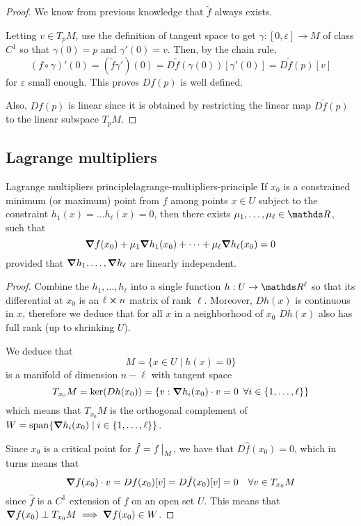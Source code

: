 \documentclass[12pt]{extarticle}
\numberwithin{equation}{subsection}
\begin{document}
\begin{proof}
	We know from previous knowledge that $\tilde f$ always exists.

	Letting $v \in T_pM$, use the definition of tangent space to get $\gamma: [0, \varepsilon] \to M$
	of class $C^1$ so that $\gamma(0) = p$ and $\gamma'(0) = v$.
	Then, by the chain rule,
	\begin{equation}
		(f\circ \gamma)'(0) = (\tilde f \gamma')(0) = D \tilde f(\gamma(0))[\gamma'(0)] = D \tilde
		f(p)[v]
	\end{equation}
	for $\varepsilon$ small enough.
	This proves $Df(p)$ is well defined.

	Also, $Df(p)$ is linear since it is obtained by restricting the linear map $D \tilde f(p)$ to the
	linear subspace $T_pM$.
\end{proof}

\subsection{Lagrange multipliers}

\begin{theorem}{Lagrange multipliers principle}{lagrange-multipliers-principle}
	If $x_0$ is a constrained minimum (or maximum) point from $f$ among points $x \in U$ subject to
	the constraint $h_1(x) = \dots h_\ell(x) = 0$, then there exists $\mu_1, \dots, \mu_\ell \in \R$,
	such that
	\begin{equation}
		\grad f(x_0) + \mu_1 \grad h_1 (x_0) + \dots + \mu_\ell \grad h_\ell(x_0) = 0
	\end{equation}
	provided that $\grad h_1, \dots, \grad h_\ell$ are linearly independent.
\end{theorem}

\begin{proof}
	Combine the $h_1, \dots, h_\ell$ into a single function $h: U \to \R^\ell$ so that its
	differential at $x_0$ is an $\ell \cross n$ matrix of rank $\ell$.
	Moreover, $Dh(x)$ is continuous in $x$, therefore we deduce that for all $x$ in a neighborhood of
	$x_0$ $Dh(x)$ also has full rank (up to shrinking $U$).

	We deduce that
	\begin{equation}
		M = \{ x \in U \mid h(x) = 0 \}
	\end{equation}
	is a manifold of dimension $n-\ell$ with tangent space
	\begin{equation}
		T_{x_0}M = \ker(Dh(x_0)) = \{ v : \grad h_i(x_0) \cdot v = 0 \enspace \forall i \in \{1, \dots,
		\ell\}\}
	\end{equation}
	which means that $T_{x_0}M$ is the orthogonal complement of
	$W = \mathrm{span} \{\grad{h_i}(x_0) \mid i \in \{1, \dots, \ell \} \}$.

	Since $x_0$ is a critical point for $\hat f = f \eval_M$, we have that $D\hat f(x_0) = 0$, which
	in turns means that
	\begin{equation}
		\grad f(x_0) \cdot v = Df(x_0)[v] = D\hat f(x_0)[v] = 0 \quad \forall v \in T_{x_0} M
	\end{equation}
	since $\hat f$ is a $C^1$ extension of $f$ on an open set $U$.
	This means that $\grad f(x_0) \perp T_{x_0} M \implies \grad f(x_0) \in W$.
\end{proof}
\end{document}
